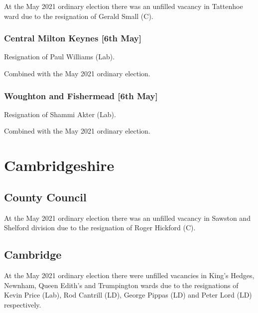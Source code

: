 \documentclass[a4paper,openany]{book}
\begin{document}
\begin{resultsiii}
At the May 2021 ordinary election there was an unfilled vacancy in Tattenhoe ward due to the resignation of Gerald Small (C).

\subsubsection*{Central Milton Keynes \hspace*{\fill}\nolinebreak[1]%
	\enspace\hspace*{\fill}
	[6th May]}


Resignation of Paul Williams (Lab).

Combined with the May 2021 ordinary election.

\subsubsection*{Woughton and Fishermead \hspace*{\fill}\nolinebreak[1]%
	\enspace\hspace*{\fill}
	[6th May]}


Resignation of Shammi Akter (Lab).

Combined with the May 2021 ordinary election.

\section{Cambridgeshire}

\subsection*{County Council}

At the May 2021 ordinary election there was an unfilled vacancy in Sawston and Shelford division due to the resignation of Roger Hickford (C).

\subsection*{Cambridge}

At the May 2021 ordinary election there were unfilled vacancies in King's Hedges, Newnham, Queen Edith's and Trumpington wards due to the resignations of Kevin Price (Lab), Rod Cantrill (LD), George Pippas (LD) and Peter Lord (LD) respectively.


\end{resultsiii}
\end{document}
